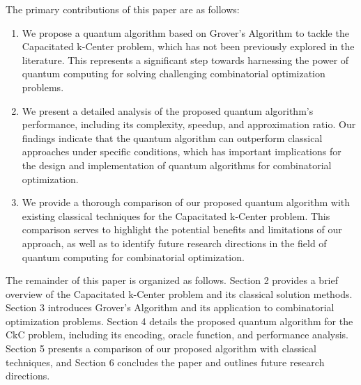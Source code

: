 The primary contributions of this paper are as follows:

\begin{enumerate}
    \item We propose a quantum algorithm based on Grover's Algorithm to tackle the Capacitated k-Center problem, which has not been previously explored in the literature. This represents a significant step towards harnessing the power of quantum computing for solving challenging combinatorial optimization problems.
    
    \item We present a detailed analysis of the proposed quantum algorithm's performance, including its complexity, speedup, and approximation ratio. Our findings indicate that the quantum algorithm can outperform classical approaches under specific conditions, which has important implications for the design and implementation of quantum algorithms for combinatorial optimization.
    
    \item We provide a thorough comparison of our proposed quantum algorithm with existing classical techniques for the Capacitated k-Center problem. This comparison serves to highlight the potential benefits and limitations of our approach, as well as to identify future research directions in the field of quantum computing for combinatorial optimization.
\end{enumerate}

The remainder of this paper is organized as follows. Section 2 provides a brief overview of the Capacitated k-Center problem and its classical solution methods. Section 3 introduces Grover's Algorithm and its application to combinatorial optimization problems. Section 4 details the proposed quantum algorithm for the CkC problem, including its encoding, oracle function, and performance analysis. Section 5 presents a comparison of our proposed algorithm with classical techniques, and Section 6 concludes the paper and outlines future research directions.

\endinput

\section{Capacitated k-Center Problem Representation}

In the Capacitated k-Center problem, we are given a set of clients with associated demands and a set of potential facility locations. Each facility has a maximum capacity, and the objective is to open a limited number of facilities (k) such that the total demand of the clients assigned to each facility does not exceed its capacity, and the maximum distance between a client and its assigned facility is minimized. In our implementation, we use the ARM assembly code to represent a solution to the Capacitated k-Center problem using the registers R0 and R1, where the values in R0 and R1 represent the capacity and the number of centers (k), respectively.

